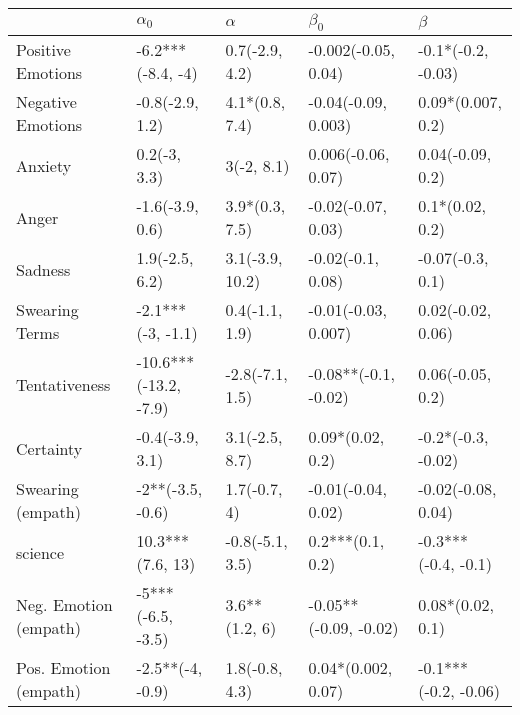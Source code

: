 \begin{tabular}{lllll}
\toprule
{} &             $\alpha_0$ &         $\alpha$ &              $\beta_0$ &               $\beta$ \\
\midrule
Positive Emotions     &      -6.2***(-8.4, -4) &   0.7(-2.9, 4.2) &    -0.002(-0.05, 0.04) &    -0.1*(-0.2, -0.03) \\
Negative Emotions     &        -0.8(-2.9, 1.2) &   4.1*(0.8, 7.4) &    -0.04(-0.09, 0.003) &     0.09*(0.007, 0.2) \\
Anxiety               &           0.2(-3, 3.3) &       3(-2, 8.1) &     0.006(-0.06, 0.07) &      0.04(-0.09, 0.2) \\
Anger                 &        -1.6(-3.9, 0.6) &   3.9*(0.3, 7.5) &     -0.02(-0.07, 0.03) &       0.1*(0.02, 0.2) \\
Sadness               &         1.9(-2.5, 6.2) &  3.1(-3.9, 10.2) &      -0.02(-0.1, 0.08) &      -0.07(-0.3, 0.1) \\
Swearing Terms        &      -2.1***(-3, -1.1) &   0.4(-1.1, 1.9) &    -0.01(-0.03, 0.007) &     0.02(-0.02, 0.06) \\
Tentativeness         &  -10.6***(-13.2, -7.9) &  -2.8(-7.1, 1.5) &   -0.08**(-0.1, -0.02) &      0.06(-0.05, 0.2) \\
Certainty             &        -0.4(-3.9, 3.1) &   3.1(-2.5, 8.7) &       0.09*(0.02, 0.2) &    -0.2*(-0.3, -0.02) \\
Swearing (empath)     &       -2**(-3.5, -0.6) &     1.7(-0.7, 4) &     -0.01(-0.04, 0.02) &    -0.02(-0.08, 0.04) \\
science               &       10.3***(7.6, 13) &  -0.8(-5.1, 3.5) &       0.2***(0.1, 0.2) &   -0.3***(-0.4, -0.1) \\
Neg. Emotion (empath) &      -5***(-6.5, -3.5) &    3.6**(1.2, 6) &  -0.05**(-0.09, -0.02) &      0.08*(0.02, 0.1) \\
Pos. Emotion (empath) &       -2.5**(-4, -0.9) &   1.8(-0.8, 4.3) &     0.04*(0.002, 0.07) &  -0.1***(-0.2, -0.06) \\
\bottomrule
\end{tabular}
